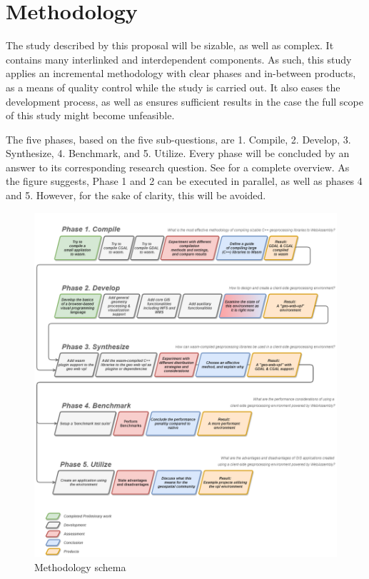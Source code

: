 
\section{Methodology}


The study described by this proposal will be sizable, as well as complex. 
It contains many interlinked and interdependent components. 
As such, this study applies an incremental methodology with clear phases and in-between products, as a means of quality control while the study is carried out. 
It also eases the development process, as well as ensures sufficient results in the case the full scope of this study might become unfeasible. 

The five phases, based on the five sub-questions, are 1. Compile, 2. Develop, 3. Synthesize, 4. Benchmark, and 5. Utilize. Every phase will be concluded by an answer to its corresponding research question. See  for a complete overview. As the figure suggests, Phase 1 and 2 can be executed in parallel, as well as phases 4 and 5. However, for the sake of clarity, this will be avoided. 

\begin{figure}
    \centering
    \graphicspath{ {../schemas/methodology/} }
    \includegraphics[width=14cm]{method.png}
    \caption{Methodology schema}
    \label{fig:method}
\end{figure}


